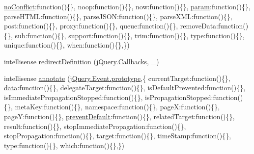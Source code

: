 \begin{DoxyCompactItemize}
\textquotesingle{}\hyperlink{_scripts_2bootstrap_8min_8js_ac26971afe341e4079ee34fceab395fc2}{no\+Conflict}\textquotesingle{}\+:function()\{\}, \textquotesingle{}noop\textquotesingle{}\+:function()\{\}, \textquotesingle{}now\textquotesingle{}\+:function()\{\}, \textquotesingle{}\hyperlink{_scripts_2jquery-1_810_82_8min_8js_ae8915303d11557d1b001bc56b6195251}{param}\textquotesingle{}\+:function()\{\}, \textquotesingle{}parse\+H\+T\+M\+L\textquotesingle{}\+:function()\{\}, \textquotesingle{}parse\+J\+S\+O\+N\textquotesingle{}\+:function()\{\}, \textquotesingle{}parse\+X\+M\+L\textquotesingle{}\+:function()\{\}, \textquotesingle{}post\textquotesingle{}\+:function()\{\}, \textquotesingle{}proxy\textquotesingle{}\+:function()\{\}, \textquotesingle{}queue\textquotesingle{}\+:function()\{\}, \textquotesingle{}remove\+Data\textquotesingle{}\+:function()\{\}, \textquotesingle{}sub\textquotesingle{}\+:function()\{\}, \textquotesingle{}support\textquotesingle{}\+:function()\{\}, \textquotesingle{}trim\textquotesingle{}\+:function()\{\}, \textquotesingle{}type\textquotesingle{}\+:function()\{\}, \textquotesingle{}unique\textquotesingle{}\+:function()\{\}, \textquotesingle{}when\textquotesingle{}\+:function()\{\},\})
\item 
intellisense \hyperlink{jquery-1_810_82_8intellisense_8js_abeba0f4b2ef2a8a655ac517b37c9fc63}{redirect\+Definition} (\hyperlink{jquery-1_810_82_8intellisense_8js_add8d59d25831bb9b171fdbee8a18795b}{j\+Query.\+Callbacks}, \hyperlink{jquery-1_810_82_8intellisense_8js_af58a9af35e2376001e3219aef7e0bda3}{\+\_})
\item 
intellisense \hyperlink{jquery-1_810_82_8intellisense_8js_a55098c3abe028707512d17d570d3486b}{annotate} (\hyperlink{_scripts_2jquery-1_810_82_8js_ab5e5d0976552f788d31448ed049ae4a4}{j\+Query.\+Event.\+prototype},\{ \textquotesingle{}current\+Target\textquotesingle{}\+:function()\{\}, \textquotesingle{}\hyperlink{jquery_8unobtrusive-ajax_8min_8js_a8f172ae31c11770303ca0c4cb48ceb3a}{data}\textquotesingle{}\+:function()\{\}, \textquotesingle{}delegate\+Target\textquotesingle{}\+:function()\{\}, \textquotesingle{}is\+Default\+Prevented\textquotesingle{}\+:function()\{\}, \textquotesingle{}is\+Immediate\+Propagation\+Stopped\textquotesingle{}\+:function()\{\}, \textquotesingle{}is\+Propagation\+Stopped\textquotesingle{}\+:function()\{\}, \textquotesingle{}meta\+Key\textquotesingle{}\+:function()\{\}, \textquotesingle{}namespace\textquotesingle{}\+:function()\{\}, \textquotesingle{}page\+X\textquotesingle{}\+:function()\{\}, \textquotesingle{}page\+Y\textquotesingle{}\+:function()\{\}, \textquotesingle{}\hyperlink{jquery_8unobtrusive-ajax_8min_8js_a03e5bb88845031b7f017b0a5f0921d5b}{prevent\+Default}\textquotesingle{}\+:function()\{\}, \textquotesingle{}related\+Target\textquotesingle{}\+:function()\{\}, \textquotesingle{}result\textquotesingle{}\+:function()\{\}, \textquotesingle{}stop\+Immediate\+Propagation\textquotesingle{}\+:function()\{\}, \textquotesingle{}stop\+Propagation\textquotesingle{}\+:function()\{\}, \textquotesingle{}target\textquotesingle{}\+:function()\{\}, \textquotesingle{}time\+Stamp\textquotesingle{}\+:function()\{\}, \textquotesingle{}type\textquotesingle{}\+:function()\{\}, \textquotesingle{}which\textquotesingle{}\+:function()\{\},\})

\end{DoxyCompactItemize}

